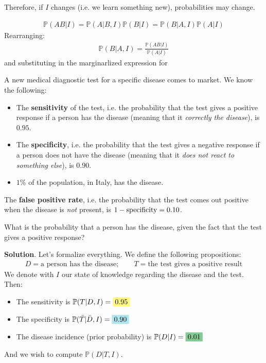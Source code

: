 \documentclass[../template.tex]{subfiles}
\begin{document}
\medskip

Therefore, if $I$ changes (i.e. we learn something new), probabilities may change.





\begin{align*}
    \mathbb{P}(AB|I) = \mathbb{P}(A|B,I) \mathbb{P}(B|I) = \mathbb{P}(B|A,I)\mathbb{P}(A|I)
\end{align*}
Rearranging:
\begin{align*}
    \mathbb{P}(B|A,I) = \frac{\mathbb{P}(AB|I)}{\mathbb{P}(A|I)} 
\end{align*}
and substituting in the marginarlized expression for 


\begin{exo}
    A new medical diagnostic test for a specific disease comes to market. We know the following:
    \begin{itemize}
        \item The \textbf{sensitivity} of the test, i.e. the probability that the test gives a positive response if a person has the disease (meaning that it \textit{correctly  the disease}), is $0.95$.
        \item The \textbf{specificity}, i.e. the probability that the test gives a negative response if a person does not have the disease (meaning that it \textit{does not react to something else}), is $0.90$.  
        \item $1\%$ of the population, in Italy, has the disease.
    \end{itemize}
    \begin{expl}
        The \textbf{false positive rate}, i.e. the probability that the test comes out positive when the disease is \textit{not} present, is $1-\rm{specificity}=0.10$.
    \end{expl}
    
    What is the probability that a person has the disease, given the fact that the test gives a positive response?

    \medskip

    \textbf{Solution}. Let's formalize everything. We define the following propositions:
    \begin{align*}
        D = \text{a person has the disease}; \qquad T = \text{the test gives a positive result}
    \end{align*} 
    We denote with $I$ our state of knowledge regarding the disease and the test.
    Then:
    \begin{itemize}
        \item The sensitivity is $\mathbb{P}(T|D,I) = \hlc{Yellow}{0.95}$ 
        \item The specificity is $\mathbb{P}(\bar{T}|\bar{D}, I) = \hlc{SkyBlue}{0.90}$
        \item The disease incidence (prior probability) is $\mathbb{P}(D|I) = \hlc{ForestGreen}{0.01}$
    \end{itemize}
    And we wish to compute $\mathbb{P}(D|T,I)$.
    

\end{exo}
\end{document}
